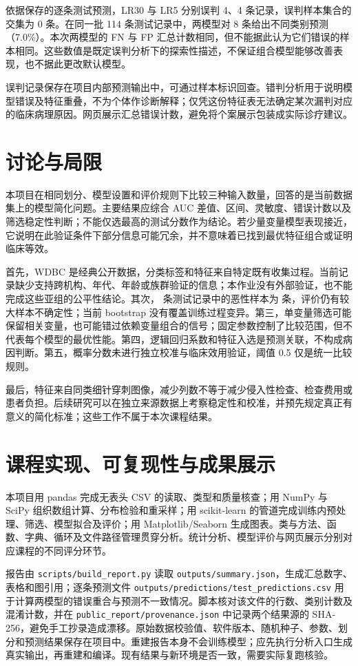 \documentclass[UTF8,fontset=none,zihao=-4]{ctexart}
\begin{document}
依据保存的逐条测试预测，LR30 与 LR5 分别误判 4、4 条记录，误判样本集合的交集为 0 条。在同一批 114 条测试记录中，两模型对 8 条给出不同类别预测（7.0\%）。本次两模型的 FN 与 FP 汇总计数相同，但不能据此认为它们错误的样本相同。这些数值是既定误判分析下的探索性描述，不保证组合模型能够改善表现，也不据此更改默认模型。

误判记录保存在项目内部预测输出中，可通过样本标识回查。错判分析用于说明模型错误及特征重叠，不为个体作诊断解释；仅凭这份特征表无法确定某次漏判对应的临床病理原因。网页展示汇总错误计数，避免将个案展示包装成实际诊疗建议。
\FloatBarrier

\section{讨论与局限}
本项目在相同划分、模型设置和评价规则下比较三种输入数量，回答的是当前数据集上的模型简化问题。主要结果应综合 AUC 差值、区间、灵敏度、错误计数以及筛选稳定性判断；不能仅选最高的测试分数作为结论。若少量变量模型表现接近，它说明在此验证条件下部分信息可能冗余，并不意味着已找到最优特征组合或证明临床等效。

首先，WDBC 是经典公开数据，分类标签和特征来自特定既有收集过程。当前记录缺少支持跨机构、年代、年龄或族群验证的信息；本作业没有外部验证，也不能完成这些亚组的公平性结论。其次，\TestN{} 条测试记录中的恶性样本为 \TestM{} 条，评价仍有较大样本不确定性；当前 bootstrap 没有覆盖训练过程变异。第三，单变量筛选可能保留相关变量，也可能错过依赖变量组合的信号；固定参数控制了比较范围，但不代表每个模型的最优性能。第四，逻辑回归系数和特征入选是预测关联，不构成病因判断。第五，概率分数未进行独立校准与临床效用验证，阈值 0.5 仅是统一比较规则。

最后，特征来自同类细针穿刺图像，减少列数不等于减少侵入性检查、检查费用或患者负担。后续研究可以在独立来源数据上考察稳定性和校准，并预先规定真正有意义的简化标准；这些工作不属于本次课程结果。

\section{课程实现、可复现性与成果展示}
本项目用 pandas 完成无表头 CSV 的读取、类型和质量核查；用 NumPy 与 SciPy 组织数组计算、分布检验和重采样；用 scikit-learn 的管道完成训练内预处理、筛选、模型拟合及评价；用 Matplotlib/Seaborn 生成图表。类与方法、函数、字典、循环及文件路径管理贯穿分析。统计分析、模型评价与网页展示分别对应课程的不同评分环节。

报告由 \texttt{scripts/build\_report.py} 读取 \texttt{outputs/summary.json}，生成汇总数字、表格和图引用；逐条预测文件 \texttt{outputs/predictions/test\_predictions.csv} 用于计算两模型的错误重合与预测不一致情况。脚本核对该文件的行数、类别计数及混淆计数，并在 \texttt{public\_report/provenance.json} 中记录两个结果源的 SHA-256，避免手工抄录造成漂移。原始数据校验值、软件版本、随机种子、参数、划分和预测结果保存在项目中。重建报告本身不会训练模型；应先执行分析入口生成真实输出，再重建和编译。现有结果与新环境是否一致，需要实际复跑核验。
\end{document}
